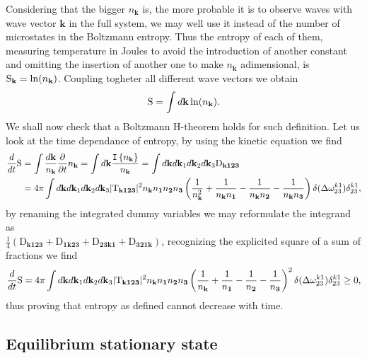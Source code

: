 Considering that the bigger $n_\mathbf{k}$ is, the more probable it is to observe waves with wave vector $\mathbf{k}$ in the full system, 
we may well use it instead of the number 
of microstates in the Boltzmann entropy. Thus the entropy of each of them, measuring temperature in Joules to avoid the introduction of another constant
and omitting the insertion of another one to make $n_\mathbf{k}$ adimensional, is $\mathrm{S}_\mathbf{k} = \ln(n_\mathbf{k})$. 
Coupling togheter all different wave vectors we obtain 
\begin{equation}
    \mathrm{S} = \int d\mathbf{k} \ln(n_\mathbf{k}).
\end{equation}
We shall now check that a Boltzmann H-theorem holds for such definition. Let us look at the time dependance of entropy, by using the kinetic equation we find
\begin{align}
    \frac{d}{dt} \mathrm{S} &= \int \frac{d\mathbf{k}}{n_\mathbf{k}} \frac{\partial}{\partial t} n_\mathbf{k} = \int d\mathbf{k} \frac{\mathtt{I}\left\{n_\mathbf{k}\right\}}{n_\mathbf{k}} = 
    \int d\mathbf{k} d\mathbf{k}_1 d\mathbf{k}_2 d\mathbf{k}_3 \mathrm{D}_\mathbf{k123}\\
    &= 4\pi \int d\mathbf{k} d\mathbf{k}_1 d\mathbf{k}_2 d\mathbf{k}_3 |\mathrm{T}_{\mathbf{k123}}|^2 n_\mathbf{k}n_\mathbf{1}n_\mathbf{2}n_\mathbf{3} 
     \left(\frac{1}{n_\mathbf{k}^2} + \frac{1}{n_\mathbf{k} n_\mathbf{1}}-\frac{1}{n_\mathbf{k} n_\mathbf{2}}-\frac{1}{n_\mathbf{k} n_\mathbf{3}}\right)
    \delta(\Delta{\omega}^{k1}_{23})\delta^{k1}_{23},
\end{align}
by renaming the integrated dummy variables we may reformulate the integrand as \\ 
$\frac{1}{4} \left(\mathrm{D}_\mathbf{k123}+\mathrm{D}_\mathbf{1k23}+\mathrm{D}_\mathbf{23k1}+
\mathrm{D}_\mathbf{321k} \right)$, recognizing the explicited square of a sum of fractions we find
\begin{equation}
    \frac{d}{dt} \mathrm{S} = 4\pi \int d\mathbf{k} d\mathbf{k}_1 d\mathbf{k}_2 d\mathbf{k}_3 |\mathrm{T}_{\mathbf{k123}}|^2 n_\mathbf{k}n_\mathbf{1}n_\mathbf{2}n_\mathbf{3} 
     \left( \frac{1}{n_\mathbf{k}} + \frac{1}{n_\mathbf{1}}-\frac{1}{n_\mathbf{2}}-\frac{1}{n_\mathbf{3}}\right)^2 
    \delta(\Delta{\omega}^{k1}_{23})\delta^{k1}_{23}\ge 0,
\end{equation}
thus proving that entropy as defined cannot decrease with time. \\

\subsection{Equilibrium stationary state}

